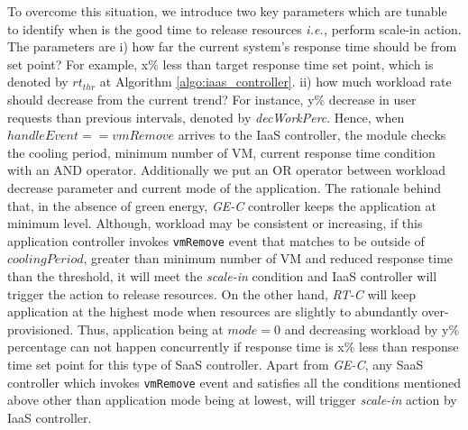  To overcome this situation, we introduce two key parameters which are tunable to identify when is the good time to release resources \emph{i.e.,} perform scale-in action. The parameters are i) how far the current system's response time should be from set point? For example, x\% less than target response time set point, which is denoted by $rt_{thr}$ at Algorithm \ref{algo:iaas_controller}. ii) how much workload rate should decrease from the current trend? For instance, y\% decrease in user requests than previous intervals, denoted by \emph{decWorkPerc}. Hence, when $handleEvent == vmRemove$ arrives to the IaaS controller, the module checks the cooling period, minimum number of VM, current response time condition
with an AND operator. Additionally we put an OR operator between workload decrease parameter and current mode of the application. The rationale behind that, in the absence of green energy, \emph{GE-C} controller keeps the application at minimum level. Although, workload may be consistent or increasing, if this application controller invokes \texttt{vmRemove} event that matches to be outside of $coolingPeriod$, greater than minimum number of VM and reduced response time than the threshold, it will meet the \emph{scale-in} condition and IaaS controller will trigger the action to release resources. On the other hand, \emph{RT-C} will keep application at the highest mode when resources are slightly to abundantly over-provisioned. Thus, application being at $mode=0$ and decreasing workload by y\% percentage can not happen concurrently if response time is x\% less than response time set point for this type of SaaS controller. Apart from \emph{GE-C}, any SaaS controller which invokes \texttt{vmRemove} event and satisfies all the conditions mentioned above other than application mode being at lowest, will trigger \emph{scale-in} action by IaaS controller.




